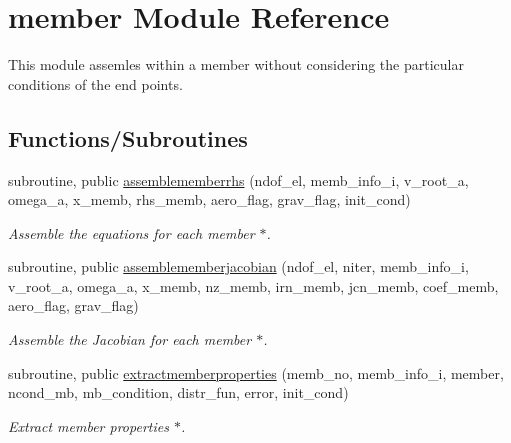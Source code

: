 \hypertarget{namespacemember}{}\section{member Module Reference}
\label{namespacemember}


This module assemles within a member without considering the particular conditions of the end points.  


\subsection*{Functions/\+Subroutines}
\begin{DoxyCompactItemize}
\item 
subroutine, public \hyperlink{namespacemember_ac35a49c8cdb17a8b26f8c4b23d6053be}{assemblememberrhs} (ndof\+\_\+el, memb\+\_\+info\+\_\+i, v\+\_\+root\+\_\+a, omega\+\_\+a, x\+\_\+memb, rhs\+\_\+memb, aero\+\_\+flag, grav\+\_\+flag, init\+\_\+cond)
\begin{DoxyCompactList}\small\item\em Assemble the equations for each member $\ast$. \end{DoxyCompactList}\item 
subroutine, public \hyperlink{namespacemember_ad1206aacf86963bb366e5976c4f605c2}{assemblememberjacobian} (ndof\+\_\+el, niter, memb\+\_\+info\+\_\+i, v\+\_\+root\+\_\+a, omega\+\_\+a, x\+\_\+memb, nz\+\_\+memb, irn\+\_\+memb, jcn\+\_\+memb, coef\+\_\+memb, aero\+\_\+flag, grav\+\_\+flag)
\begin{DoxyCompactList}\small\item\em Assemble the Jacobian for each member $\ast$. \end{DoxyCompactList}\item 
subroutine, public \hyperlink{namespacemember_a8618a013da87b108e5e91013028fc1a8}{extractmemberproperties} (memb\+\_\+no, memb\+\_\+info\+\_\+i, member, ncond\+\_\+mb, mb\+\_\+condition, distr\+\_\+fun, error, init\+\_\+cond)
\begin{DoxyCompactList}\small\item\em Extract member properties $\ast$. \end{DoxyCompactList}\end{DoxyCompactItemize}
